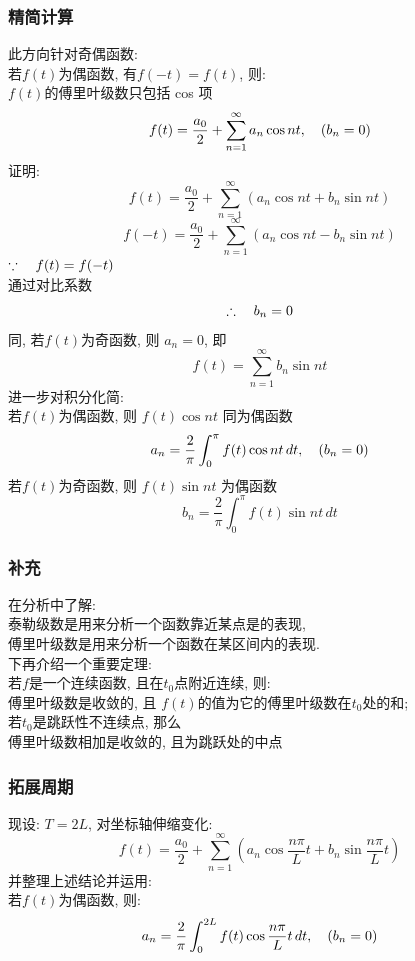 \subsubsection{\large 精简计算}
此方向针对奇偶函数:\\
若$f(t)$为偶函数, 有$f(-t) = f(t) $, 则:\\
$f(t)$的傅里叶级数只包括 cos 项
\[ f(t) = \frac{a_0}{2} + \sum_{n = 1}^{\infty} a_n \cos nt  , \hspace*{1em} (b_n = 0)\]
证明:
\[ f(t) = \frac{a_0}{2} + \sum_{n = 1}^{\infty} (a_n \cos nt  + b_n \sin nt)  \]
\[ f(-t) = \frac{a_0}{2} + \sum_{n = 1}^{\infty} (a_n \cos nt  - b_n \sin nt) \]
$ \because \hspace*{1em} f(t) = f(-t) $\\
通过对比系数
\[ \therefore \hspace*{1em} b_n = 0 \]
同, 若$f(t)$为奇函数, 则 $a_n = 0$, 即
\[ f(t) =  \sum_{n = 1}^{\infty} b_n \sin nt  \]
进一步对积分化简:\\
若$f(t)$为偶函数, 则 $f(t)\cos nt $ 同为偶函数
\[ a_n  = \frac{2}{\pi} \int_{0}^{\pi}  f(t) \cos nt \,dt ,\hspace*{1em} (b_n = 0)  \]
若$f(t)$为奇函数, 则 $f(t)\sin nt $ 为偶函数
\[ b_n  = \frac{2}{\pi} \int_{0}^{\pi}  f(t) \sin nt \,dt  \]

\subsubsection{\large 补充}
在分析中了解:\\
泰勒级数是用来分析一个函数靠近某点是的表现, \\
傅里叶级数是用来分析一个函数在某区间内的表现.\\
下再介绍一个重要定理:\\
若$f$是一个连续函数, 且在$t_0$点附近连续, 则:\\
傅里叶级数是收敛的, 且
$f(t)$的值为它的傅里叶级数在$t_0$处的和;\\
若$t_0$是跳跃性不连续点, 那么\\
傅里叶级数相加是收敛的, 且为跳跃处的中点

\subsubsection{\large 拓展周期}
现设: $T = 2 L$, 对坐标轴伸缩变化:
\[ f(t) = \frac{a_0}{2} + \sum_{n = 1}^{\infty} (a_n \cos \frac{n \pi}{L}t  + b_n \sin \frac{n \pi}{L}t )  \]
并整理上述结论并运用:\\
若$f(t)$为偶函数, 则:
\[ a_n  = \frac{2}{\pi} \int_{0}^{2L}  f(t) \cos \frac{n \pi}{L}t \,dt ,\hspace*{1em} (b_n = 0)  \]

